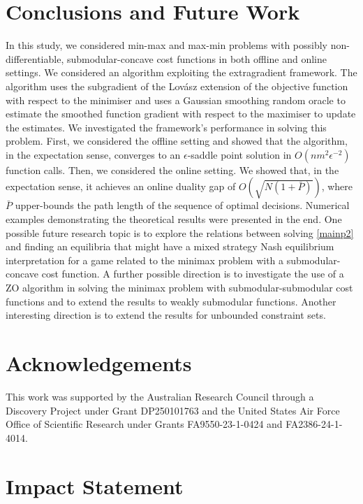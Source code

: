 \documentclass{article}
\theoremstyle{plain}
\theoremstyle{definition}
\theoremstyle{remark}
\begin{document}
\section{Conclusions and Future Work}\label{sec:conc}
In this study, we considered min-max and max-min problems with possibly non-differentiable, submodular-concave cost functions in both offline and online settings. We considered an algorithm exploiting the extragradient framework. The algorithm uses the subgradient of the Lovász extension of the objective function with respect to the minimiser and uses a Gaussian smoothing random oracle to estimate the smoothed function gradient with respect to the maximiser to update the estimates. We investigated the framework's performance in solving this 
problem.
First, we considered the offline setting and showed that the algorithm, in the expectation sense, converges to an $\epsilon$-saddle point solution in $O(nm^2\epsilon^{-2})$ function calls. Then, we considered the online setting. We showed that, in the expectation sense, it achieves an online duality gap of $O(\sqrt{N(1+\bar{P})})$, where $\bar{P}$ upper-bounds the path length of the sequence of optimal decisions. Numerical examples demonstrating the theoretical results were presented in the end.
One possible future research topic is to explore the relations between solving \eqref{mainp2} and finding an equilibria that might have a mixed strategy Nash equilibrium interpretation for a game related to the minimax problem with a submodular-concave cost function.
A further possible direction is to investigate the use of a ZO algorithm in solving the minimax problem with submodular-submodular cost functions and to 
extend the results to weakly submodular functions. 
Another interesting direction is to extend the results for unbounded constraint sets.


\section*{Acknowledgements}
This work was supported by the Australian Research
Council through a Discovery Project under Grant DP250101763 and the United States Air Force Office of Scientific Research under Grants FA9550-23-1-0424 and FA2386-24-1-4014.

\section*{Impact Statement}
\end{document}
